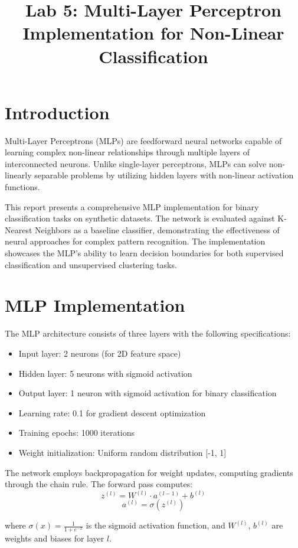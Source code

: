 \documentclass[11pt,a4paper]{article}
\title{Lab 5: Multi-Layer Perceptron Implementation for Non-Linear Classification}
\author{}
\date{}
\begin{document}
\maketitle

\section{Introduction}

Multi-Layer Perceptrons (MLPs) are feedforward neural networks capable of learning complex non-linear relationships through multiple layers of interconnected neurons. Unlike single-layer perceptrons, MLPs can solve non-linearly separable problems by utilizing hidden layers with non-linear activation functions.

This report presents a comprehensive MLP implementation for binary classification tasks on synthetic datasets. The network is evaluated against K-Nearest Neighbors as a baseline classifier, demonstrating the effectiveness of neural approaches for complex pattern recognition. The implementation showcases the MLP's ability to learn decision boundaries for both supervised classification and unsupervised clustering tasks.

\section{MLP Implementation}

The MLP architecture consists of three layers with the following specifications:
\begin{itemize}
\item Input layer: 2 neurons (for 2D feature space)
\item Hidden layer: 5 neurons with sigmoid activation
\item Output layer: 1 neuron with sigmoid activation for binary classification
\item Learning rate: 0.1 for gradient descent optimization
\item Training epochs: 1000 iterations
\item Weight initialization: Uniform random distribution [-1, 1]
\end{itemize}

The network employs backpropagation for weight updates, computing gradients through the chain rule. The forward pass computes:
$$z^{(l)} = W^{(l)} \cdot a^{(l-1)} + b^{(l)}$$
$$a^{(l)} = \sigma(z^{(l)})$$

where $\sigma(x) = \frac{1}{1 + e^{-x}}$ is the sigmoid activation function, and $W^{(l)}$, $b^{(l)}$ are weights and biases for layer $l$.
\end{document}
